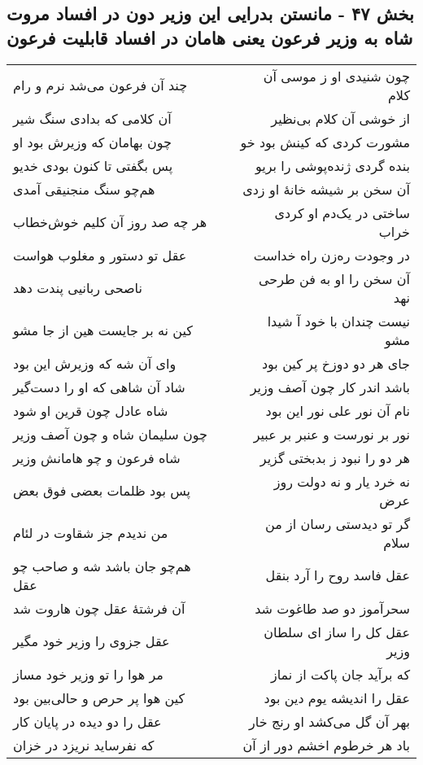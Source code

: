 \begin{center}
\section*{بخش ۴۷ - مانستن بدرایی این وزیر دون در افساد مروت شاه به وزیر فرعون یعنی هامان در افساد قابلیت فرعون}
\label{sec:sh047}
\begin{longtable}{l p{0.5cm} r}
چند آن فرعون می‌شد نرم و رام
&&
چون شنیدی او ز موسی آن کلام
\\
آن کلامی که بدادی سنگ شیر
&&
از خوشی آن کلام بی‌نظیر
\\
چون بهامان که وزیرش بود او
&&
مشورت کردی که کینش بود خو
\\
پس بگفتی تا کنون بودی خدیو
&&
بنده گردی ژنده‌پوشی را بریو
\\
هم‌چو سنگ منجنیقی آمدی
&&
آن سخن بر شیشه خانهٔ او زدی
\\
هر چه صد روز آن کلیم خوش‌خطاب
&&
ساختی در یک‌دم او کردی خراب
\\
عقل تو دستور و مغلوب هواست
&&
در وجودت ره‌زن راه خداست
\\
ناصحی ربانیی پندت دهد
&&
آن سخن را او به فن طرحی نهد
\\
کین نه بر جایست هین از جا مشو
&&
نیست چندان با خود آ شیدا مشو
\\
وای آن شه که وزیرش این بود
&&
جای هر دو دوزخ پر کین بود
\\
شاد آن شاهی که او را دست‌گیر
&&
باشد اندر کار چون آصف وزیر
\\
شاه عادل چون قرین او شود
&&
نام آن نور علی نور این بود
\\
چون سلیمان شاه و چون آصف وزیر
&&
نور بر نورست و عنبر بر عبیر
\\
شاه فرعون و چو هامانش وزیر
&&
هر دو را نبود ز بدبختی گزیر
\\
پس بود ظلمات بعضی فوق بعض
&&
نه خرد یار و نه دولت روز عرض
\\
من ندیدم جز شقاوت در لئام
&&
گر تو دیدستی رسان از من سلام
\\
هم‌چو جان باشد شه و صاحب چو عقل
&&
عقل فاسد روح را آرد بنقل
\\
آن فرشتهٔ عقل چون هاروت شد
&&
سحرآموز دو صد طاغوت شد
\\
عقل جزوی را وزیر خود مگیر
&&
عقل کل را ساز ای سلطان وزیر
\\
مر هوا را تو وزیر خود مساز
&&
که برآید جان پاکت از نماز
\\
کین هوا پر حرص و حالی‌بین بود
&&
عقل را اندیشه یوم دین بود
\\
عقل را دو دیده در پایان کار
&&
بهر آن گل می‌کشد او رنج خار
\\
که نفرساید نریزد در خزان
&&
باد هر خرطوم اخشم دور از آن
\\
\end{longtable}
\end{center}
